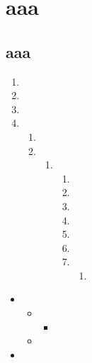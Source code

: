 \documentclass{ctexart}
\begin{document}
\chapter{aaa}
\section{aaa}
\begin{enumerate}
	\item
	\item
	\item
	\item
	      \begin{enumerate}
		      \item
		      \item
		            \begin{enumerate}
			            \item
			                  \begin{enumerate}
				                  \item
				                  \item
				                  \item
				                  \item
				                  \item
				                  \item
				                  \item
				                        \begin{enumerate}
					                        \item
				                        \end{enumerate}

			                  \end{enumerate}
		            \end{enumerate}
	      \end{enumerate}
\end{enumerate}
\begin{itemize}
	\begin{itemize}
		\item
		      \begin{itemize}
			      \item
			            \begin{itemize}
				            \item
			            \end{itemize}
			      \item
		      \end{itemize}
		\item
	\end{itemize}
\end{itemize}
\end{document}

